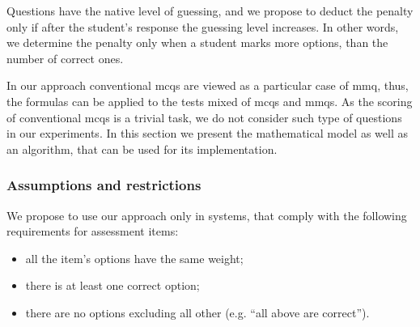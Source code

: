 \documentclass[PhD, Submit, ngerman,UKenglish,table]{scrbook}
\begin{document}
Questions have the native level of guessing, and we propose to deduct the penalty only if after the student's response the guessing level increases.
In other words, we determine the penalty only when a student marks more options, than the number of correct ones.


In our approach conventional \gls{mcq}s are viewed as a particular case of \gls{mmq}, thus, the formulas can be applied to the tests mixed of \gls{mcq}s and \gls{mmq}s.
As the scoring of conventional \gls{mcq}s is a trivial task, we do not consider such type of questions in our experiments.
In this section we present the mathematical model as well as an algorithm, that can be used for its implementation. 

\subsubsection{Assumptions and restrictions}
\label{subsec:restrictions}

We propose to use our approach only in systems, that comply with the following requirements for assessment items:

\begin{itemize}
  \item all the item's options have the same weight;
  \item there is at least one correct option;
  \item there are no options excluding all other (e.g. ``all above are correct'').
\end{itemize}
\end{document}
